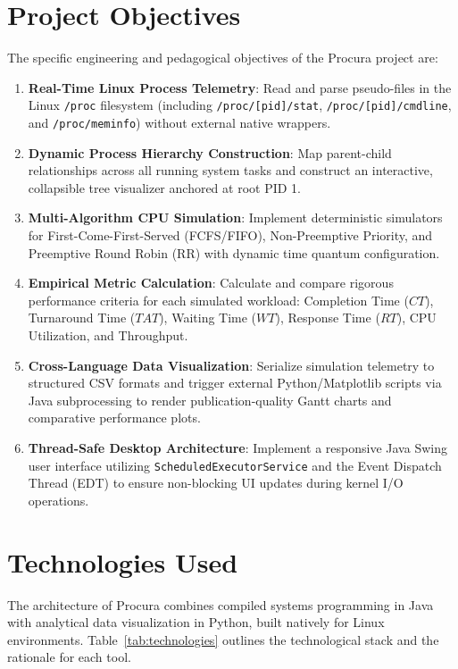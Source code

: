 \documentclass[12pt,a4paper]{article}
\begin{document}
\section{Project Objectives}
The specific engineering and pedagogical objectives of the Procura project are:
\begin{enumerate}
    \item \textbf{Real-Time Linux Process Telemetry}: Read and parse pseudo-files in the Linux \texttt{/proc} filesystem (including \texttt{/proc/[pid]/stat}, \texttt{/proc/[pid]/cmdline}, and \texttt{/proc/meminfo}) without external native wrappers.
    \item \textbf{Dynamic Process Hierarchy Construction}: Map parent-child relationships across all running system tasks and construct an interactive, collapsible tree visualizer anchored at root PID 1.
    \item \textbf{Multi-Algorithm CPU Simulation}: Implement deterministic simulators for First-Come-First-Served (FCFS/FIFO), Non-Preemptive Priority, and Preemptive Round Robin (RR) with dynamic time quantum configuration.
    \item \textbf{Empirical Metric Calculation}: Calculate and compare rigorous performance criteria for each simulated workload: Completion Time ($CT$), Turnaround Time ($TAT$), Waiting Time ($WT$), Response Time ($RT$), CPU Utilization, and Throughput.
    \item \textbf{Cross-Language Data Visualization}: Serialize simulation telemetry to structured CSV formats and trigger external Python/Matplotlib scripts via Java subprocessing to render publication-quality Gantt charts and comparative performance plots.
    \item \textbf{Thread-Safe Desktop Architecture}: Implement a responsive Java Swing user interface utilizing \texttt{ScheduledExecutorService} and the Event Dispatch Thread (EDT) to ensure non-blocking UI updates during kernel I/O operations.
\end{enumerate}

\section{Technologies Used}
The architecture of Procura combines compiled systems programming in Java with analytical data visualization in Python, built natively for Linux environments. Table~\ref{tab:technologies} outlines the technological stack and the rationale for each tool.
\end{document}

